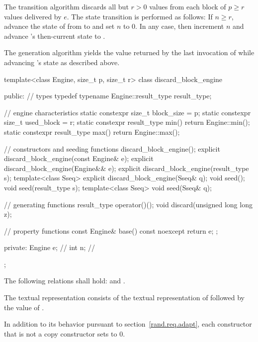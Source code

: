 \pnum
The transition algorithm%
%
discards all but $r > 0$ values
from each block of $p \geq r$ values delivered by $e$.
The state transition is performed as follows:
If $n \geq r$,
 advance the state of  from  to 
 and set $n$ to $0$.
In any case,
 then increment $n$
 and advance 's then-current state 
 to .

\pnum
The generation algorithm%
%
yields the value returned by the last invocation of 
 while advancing 's state as described above.

\begin{codeblock}
template<class Engine, size_t p, size_t r>
 class discard_block_engine
{
public:
 // types
 typedef typename Engine::result_type result_type;

 // engine characteristics
 static constexpr size_t block_size = p;
 static constexpr size_t used_block = r;
 static constexpr result_type min() { return Engine::min(); }
 static constexpr result_type max() { return Engine::max(); }

 // constructors and seeding functions
 discard_block_engine();
 explicit discard_block_engine(const Engine& e);
 explicit discard_block_engine(Engine&& e);
 explicit discard_block_engine(result_type s);
 template<class Sseq> explicit discard_block_engine(Sseq& q);
 void seed();
 void seed(result_type s);
 template<class Sseq> void seed(Sseq& q);

 // generating functions
 result_type operator()();
 void discard(unsigned long long z);

 // property functions
 const Engine& base() const noexcept { return e; };

private:
 Engine e;   // \expos
 int n;      // \expos
};
\end{codeblock}

\pnum
The following relations shall hold:
and
  .

\pnum
The textual representation%
%
consists of
 the textual representation of 
followed by
 the value of .

\pnum
In addition to its behavior
pursuant to section~\ref{rand.req.adapt},
each constructor%
that is not a copy constructor
sets  to $0$.

